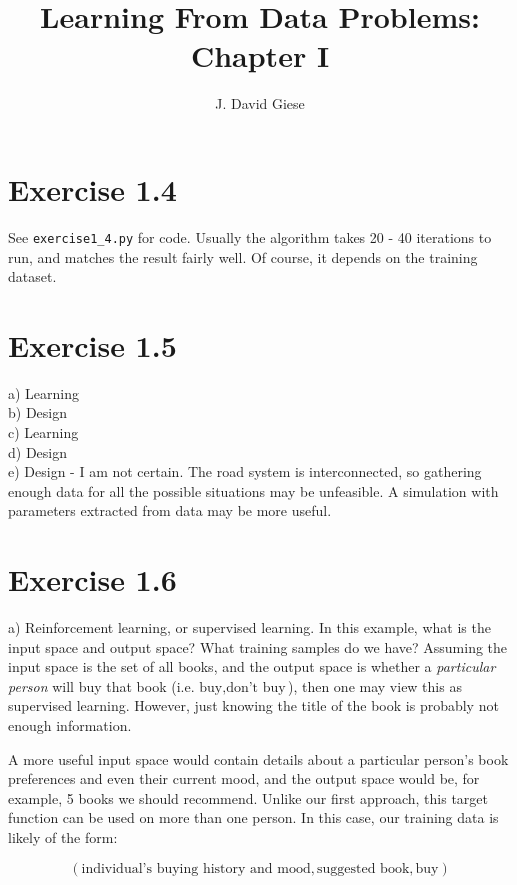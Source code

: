\documentclass[11pt,letterpaper]{article}
\title{Learning From Data Problems: Chapter I}
\date{}
\author{J. David Giese}
\begin{document}
\maketitle

\section*{Exercise 1.4}
See \texttt{exercise1_4.py} for code.  Usually the algorithm takes 20 - 40 iterations to run, and matches the result fairly well.  Of course, it depends on the training dataset.

\section*{Exercise 1.5}
a) Learning \\
b) Design \\
c) Learning \\
d) Design \\
e) Design - I am not certain.  The road system is interconnected, so gathering enough data for all the possible situations may be unfeasible.  A simulation with parameters extracted from data may be more useful. \\

\section*{Exercise 1.6}
a) Reinforcement learning, or supervised learning.  In this example, what is the input space and output space?  What training samples do we have?  Assuming the input space is the set of all books, and the output space is whether a \emph{particular person} will buy that book (i.e. ${\textrm{buy}, \textrm{don't buy}}$), then one may view this as supervised learning.  However, just knowing the title of the book is probably not enough information.

A more useful input space would contain details about a particular person's book preferences and even their current mood, and the output space would be, for example, 5 books we should recommend.  Unlike our first approach, this target function can be used on more than one person.  In this case, our training data is likely of the form:

\begin{equation*}
    (\textrm{individual's buying history and mood}, \textrm{suggested book}, \textrm{buy})
\end{equation*}
\end{document}
